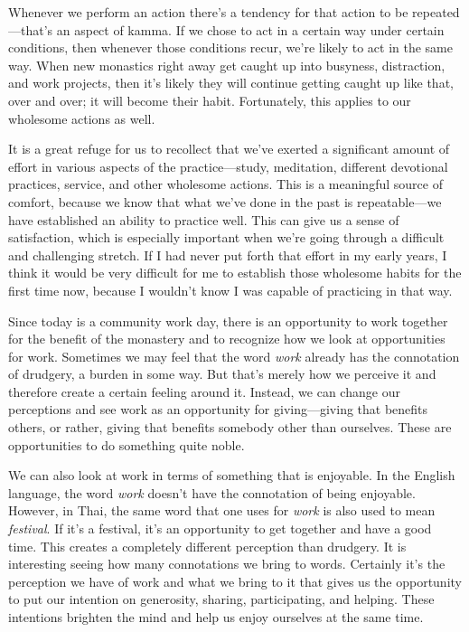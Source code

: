 Whenever we perform an action there's a tendency for that action to be 
repeated---that's an aspect of kamma. If we chose to act in a certain 
way under certain conditions, then whenever those conditions recur, 
we're likely to act in the same way. When new monastics right away get 
caught up into busyness, distraction, and work projects, then it's 
likely they will continue getting caught up like that, over and over; 
it will become their habit. Fortunately, this applies to our wholesome 
actions as well.

It is a great refuge for us to recollect that we've exerted a 
significant amount of effort in various aspects of the 
practice---study, meditation, different devotional practices, service, 
and other wholesome actions. This is a meaningful source of comfort, 
because we know that what we've done in the past is repeatable---we 
have established an ability to practice well. This can give us a sense 
of satisfaction, which is especially important when we're going through 
a difficult and challenging stretch. If I had never put forth that 
effort in my early years, I think it would be very difficult for me to 
establish those wholesome habits for the first time now, because I 
wouldn't know I was capable of practicing in that way.


Since today is a community work day, there is an opportunity to work 
together for the benefit of the monastery and to recognize how we look 
at opportunities for work. Sometimes we may feel that the word 
\emph{work} already has the connotation of drudgery, a burden in some 
way. But that's merely how we perceive it and therefore create a 
certain feeling around it. Instead, we can change our perceptions and 
see work as an opportunity for giving---giving that benefits others, or 
rather, giving that benefits somebody other than ourselves. These are 
opportunities to do something quite noble.

We can also look at work in terms of something that is enjoyable. In 
the English language, the word \emph{work} doesn't have the connotation 
of being enjoyable. However, in Thai, the same word that one uses for 
\emph{work} is also used to mean \emph{festival}. If it's a festival, 
it's an opportunity to get together and have a good time. This creates 
a completely different perception than drudgery. It is interesting 
seeing how many connotations we bring to words. Certainly it's the 
perception we have of work and what we bring to it that gives us the 
opportunity to put our intention on generosity, sharing, participating, 
and helping. These intentions brighten the mind and help us enjoy 
ourselves at the same time.

